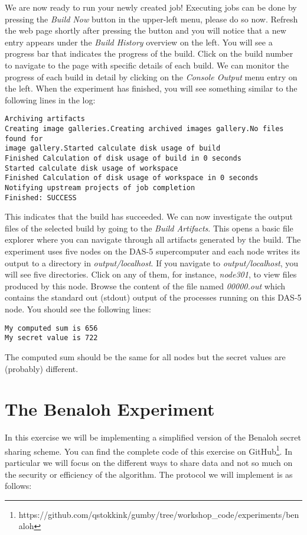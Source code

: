 \documentclass{article}
\begin{document}
We are now ready to run your newly created job!
Executing jobs can be done by pressing the \emph{Build Now} button in the upper-left menu, please do so now.
Refresh the web page shortly after pressing the button and you will notice that a new entry appears under the \emph{Build History} overview on the left.
You will see a progress bar that indicates the progress of the build.
Click on the build number to navigate to the page with specific details of each build.
We can monitor the progress of each build in detail by clicking on the \emph{Console Output} menu entry on the left.
When the experiment has finished, you will see something similar to the following lines in the log:

\begin{lstlisting}[frame=single]  % Start your code-block
Archiving artifacts
Creating image galleries.Creating archived images gallery.No files found for
image gallery.Started calculate disk usage of build
Finished Calculation of disk usage of build in 0 seconds
Started calculate disk usage of workspace
Finished Calculation of disk usage of workspace in 0 seconds
Notifying upstream projects of job completion
Finished: SUCCESS
\end{lstlisting}

This indicates that the build has succeeded.
We can now investigate the output files of the selected build by going to the \emph{Build Artifacts}.
This opens a basic file explorer where you can navigate through all artifacts generated by the build.
The experiment uses five nodes on the DAS-5 supercomputer and each node writes its output to a directory in \emph{output/localhost}.
If you navigate to \emph{output/localhost}, you will see five directories.
Click on any of them, for instance, \emph{node301}, to view files produced by this node.
Browse the content of the file named \emph{00000.out} which contains the standard out (stdout) output of the processes running on this DAS-5 node.
You should see the following lines:

\begin{lstlisting}[frame=single]
My computed sum is 656
My secret value is 722
\end{lstlisting}

The computed sum should be the same for all nodes but the secret values are (probably) different.

\section{The Benaloh Experiment}
In this exercise we will be implementing a simplified version of the Benaloh secret sharing scheme.
You can find the complete code of this exercise on GitHub\footnote{https://github.com/qstokkink/gumby/tree/workshop\_code/experiments/benaloh}.
In particular we will focus on the different ways to share data and not so much on the security or efficiency of the algorithm.
The protocol we will implement is as follows:
\end{document}
